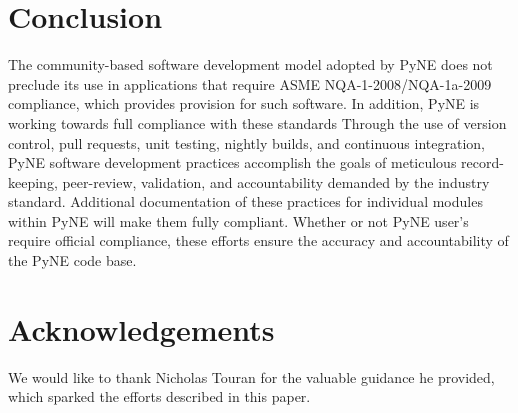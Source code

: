 \documentclass{anstrans}
\begin{document}
\section{Conclusion}

The community-based software development model adopted by PyNE does not
preclude its use in applications that require ASME NQA-1-2008/NQA-1a-2009
compliance, which provides provision for such software. In addition, PyNE is working towards full compliance with these standards
Through the use of version control, pull requests, unit testing, nightly builds, and
continuous integration, PyNE software development practices accomplish the
goals of meticulous record-keeping, peer-review, validation, and accountability
demanded by the industry standard. Additional documentation of these practices for
individual modules within PyNE will make them fully compliant. Whether or not
PyNE user's require official compliance, these efforts ensure the accuracy and
accountability of the PyNE code base.

\section{Acknowledgements}

We would like to thank Nicholas Touran for the valuable guidance he provided, which
sparked the efforts described in this paper.




\end{document}
